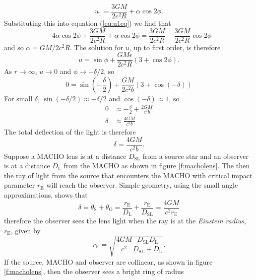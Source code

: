 \begin{equation}
u_1 = \frac{3GM}{2c^2 R} + \alpha \cos 2\phi.
\end{equation}
Substituting this into equation (\ref{eq:u1eq}) we find that
\begin{equation}
-4\alpha \cos 2\phi + \frac{3GM}{2c^2 R} + \alpha\cos 2\phi =
\frac{3GM}{2c^2 R} - \frac{3GM}{2c^2 R} \cos 2\phi
\end{equation}
and so $\alpha = GM/2c^2 R$. The solution for $u$, up to first order, is
therefore
\begin{equation}
u = \sin \phi + \frac{GM\epsilon}{2c^2 R}\left(3 + \cos 2\phi\right).
\end{equation}
As $r \rightarrow \infty$, $u \rightarrow 0$ and $\phi \rightarrow - \delta/2$,
so
\begin{equation}
0 = \sin \left(-\frac{\delta}{2}\right) + 
\frac{GM}{2c^2 b} \left(3 + \cos(-\delta)\right)
\end{equation}
For small $\delta$, $\sin(-\delta/2) \approx -\delta/2$ and $\cos(-\delta)
\approx 1$, so
\begin{align}
0 &\approx - \frac{\delta}{2} + \frac{2GM}{c^2 b} \\
\delta &\approx \frac{4GM}{c^2b}
\end{align}
The total deflection of the light is therefore
\begin{equation}
\delta = \frac{4GM}{c^2 b}.
\end{equation}
Suppose a MACHO lens is at a distance $D_\mathrm{SL}$ from a source star and
an observer is at a distance $D_\mathrm{L}$ from the MACHO as shown in figure
\ref{f:macholens}. The then the ray of light from the source that encounters
the MACHO with critical impact parameter $r_\mathrm{E}$ will reach the
observer. Simple geometry, using the small angle approximations, shows that
\begin{equation}
\delta = \theta_\mathrm{S} + \theta_\mathrm{O} =
\frac{r_\mathrm{E}}{D_\mathrm{L}} + \frac{r_\mathrm{E}}{D_\mathrm{SL}} =
\frac{4GM}{c^2r_\mathrm{E}}
\end{equation}
therefore the observer sees the lens light when the ray is at the
\emph{Einstein radius}, $r_\mathrm{E}$, given by
\begin{equation}
r_\mathrm{E} = \sqrt{\frac{4GM}{c^2} \frac{D_\mathrm{SL} D_\mathrm{L}}
{D_\mathrm{SL} + D_\mathrm{L}}}.
\end{equation}
If the source, MACHO and observer are collinear, as shown in figure
\ref{f:macholens}, then the observer sees a bright ring of radius
